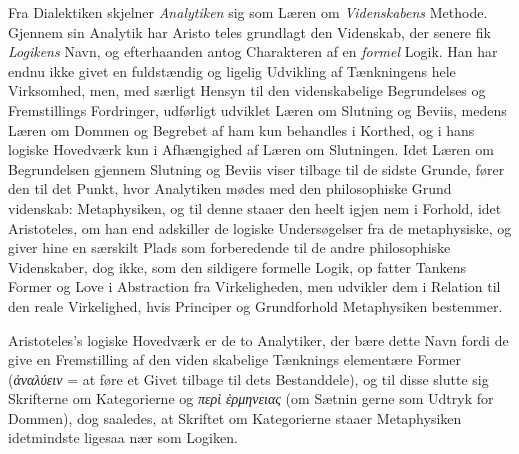 \documentclass[12pt,a4paper]{book}
\newcommand{\gk}[1]{\textit{#1}}
\begin{document}
Fra Dialektiken skjelner \emph{Analytiken} sig som Læren om
\emph{Videnskabens} Methode. Gjennem sin Analytik har Aristo\-%
teles grundlagt den Videnskab, der senere fik \emph{Logikens}
Navn, og efterhaanden antog Charakteren af en \emph{formel} Logik.
Han har endnu ikke givet en fuldstændig og ligelig Udvikling
af Tænkningens hele Virksomhed, men, med særligt Hensyn
til den videnskabelige Begrundelses og Fremstillings Fordringer,
udførligt udviklet Læren om Slutning og Beviis, medens Læren
om Dommen og Begrebet af ham kun behandles i Korthed, og
i hans logiske Hovedværk kun i Afhængighed af Læren om
Slutningen. Idet Læren om Begrundelsen gjennem Slutning
og Beviis viser tilbage til de sidste Grunde, fører den til det
Punkt, hvor Analytiken mødes med den philosophiske Grund\-%
videnskab: Metaphysiken, og til denne staaer den heelt igjen\-%
nem i Forhold, idet Aristoteles, om han end adskiller de
logiske Undersøgelser fra de metaphysiske, og giver hine en
særskilt Plads som forberedende til de andre philosophiske
Videnskaber, dog ikke, som den sildigere formelle Logik, op\-%
fatter Tankens Former og Love i Abstraction fra Virkeligheden,
men udvikler dem i Relation til den reale Virkelighed, hvis
Principer og Grundforhold Metaphysiken bestemmer.

Aristoteles's logiske Hovedværk er de to Analytiker, der
bære dette Navn fordi de give en Fremstilling af den viden\-%
skabelige Tænknings elementære Former (\gk{ἀναλύειν} = at føre
et Givet tilbage til dets Bestanddele), og til disse slutte sig
Skrifterne om Kategorierne og \gk{περὶ ἑρμηνειας} (om Sætnin\-%
gerne som Udtryk for Dommen), dog saaledes, at Skriftet om
Kategorierne staaer Metaphysiken idetmindste ligesaa nær som
Logiken.
\end{document}

